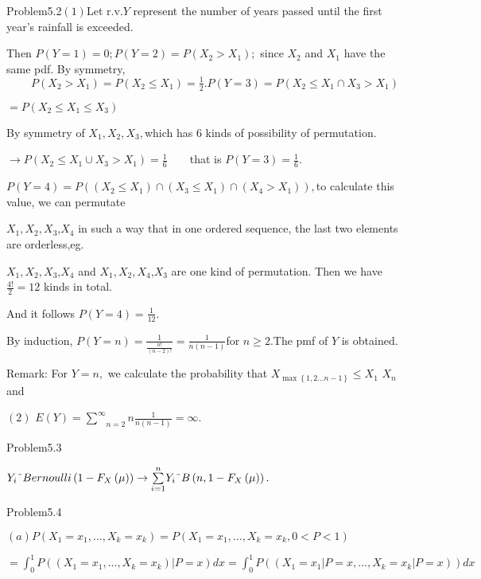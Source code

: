 \documentclass{article}
\begin{document}
Problem5.2\qquad $\left( 1\right) $Let r.v.$Y$ represent the number of years
passed until the first year's rainfall is exceeded.

Then $P\left( Y=1\right) =0;P\left( Y=2\right) =P\left( X_{2}>X_{1}\right) ;$%
since $X_{2}$ and $X_{1}$ have the same pdf. By symmetry, \ $\qquad \
P\left( X_{2}>X_{1}\right) =P\left( X_{2}\leq X_{1}\right) =\frac{1}{2}%
.P\left( Y=3\right) =P\left( X_{2}\leq X_{1}\cap X_{3}>X_{1}\right) $

$=P\left( X_{2}\leq X_{1}\leq X_{3}\right) \qquad $

By symmetry of $X_{1},X_{2},X_{3},$which has 6 kinds of possibility of
permutation.

$\rightarrow P\left( X_{2}\leq X_{1}\cup X_{3}>X_{1}\right) =\frac{1}{6}%
\qquad $that is $P\left( Y=3\right) =\frac{1}{6}.$

\bigskip $P\left( Y=4\right) =P\left( \left( X_{2}\leq X_{1}\right) \cap
\left( X_{3}\leq X_{1}\right) \cap \left( X_{4}>X_{1}\right) \right) ,$to
calculate this value, we can permutate

$X_{1},X_{2},X_{3}$,$X_{4}$ in such a way that in one ordered sequence, the
last two elements are orderless,eg.

$X_{1},X_{2},X_{3}$,$X_{4}$ and $X_{1},X_{2},X_{4}$,$X_{3}$ are one kind of
permutation. Then we have $\frac{4!}{2}=12$ kinds in total.

And it follows $P\left( Y=4\right) =\frac{1}{12}.$

By induction, $P\left( Y=n\right) =\frac{1}{\frac{n!}{\left( n-2\right) !}}=%
\frac{1}{n\left( n-1\right) }$for $n\geq 2.$The pmf of $Y$ is obtained$.$

Remark: For $Y=n,$ we calculate the probability that $X_{\max \left\{
1,2...n-1\right\} }\leq X_{1}$ \TEXTsymbol{<}$X_{n}$and 

$\left( 2\right) $ $E\left( Y\right) =\underset{n=2}{\overset{\infty }{\sum }%
}n\frac{1}{n\left( n-1\right) }=\infty .$

Problem5.3

$Y_{i}\symbol{126}Bernoulli\left( 1-F_{X}\left( \mu \right) \right)
\rightarrow \underset{i=1}{\overset{n}{\sum }}Y_{i}\symbol{126}B\left(
n,1-F_{X}\left( \mu \right) \right) .$

\bigskip Problem5.4

$\left( a\right) P\left( X_{1}=x_{1},...,X_{k}=x_{k}\right) =P\left(
X_{1}=x_{1},...,X_{k}=x_{k},0<P<1\right) $

$=\int_{0}^{1}P\left( \left( X_{1}=x_{1},...,X_{k}=x_{k}\right) |P=x\right)
dx=\int_{0}^{1}P\left( \left( X_{1}=x_{1}|P=x,...,X_{k}=x_{k}|P=x\right)
\right) dx$
\end{document}
